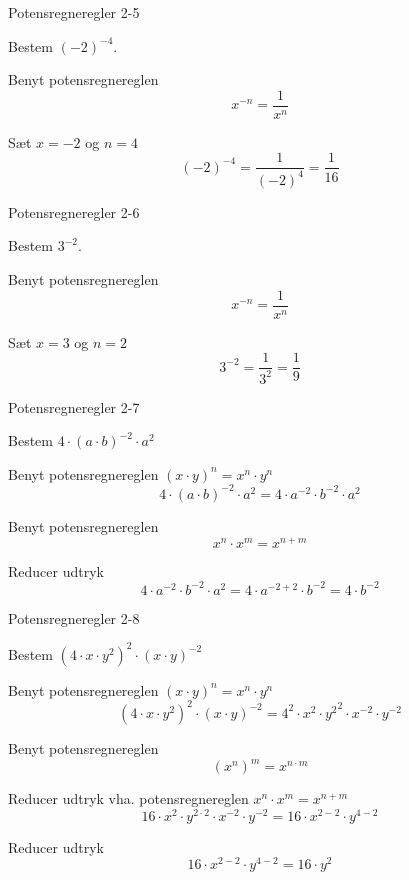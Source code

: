 \documentclass{article}
\begin{document}
\newpage

\begin{exercise}{Potensregneregler 2-5}

Bestem $(-2)^{-4}$.


\hint
Benyt potensregnereglen
\[
x^{-n} = \frac{1}{x^{n}}
\]

\hint

Sæt $x=-2$ og $n=4$
\[
(-2)^{-4} = \frac{1}{(-2)^4} = \frac{1}{16}
\]

\end{exercise}

\newpage

\begin{exercise}{Potensregneregler 2-6}

Bestem $3^{-2}$.


\hint
Benyt potensregnereglen
\[
x^{-n} = \frac{1}{x^{n}}
\]

\hint

Sæt $x=3$ og $n=2$
\[
3^{-2} = \frac{1}{3^2} = \frac{1}{9}
\]

\end{exercise}

\newpage

\begin{exercise}{Potensregneregler 2-7}

Bestem $4 \cdot (a \cdot b)^{-2} \cdot a^2$


\hint

Benyt potensregnereglen $(x \cdot y)^n = x^n \cdot y^n$
\[
4 \cdot (a \cdot b)^{-2} \cdot a^2 = 4 \cdot a^{-2} \cdot b^{-2} \cdot a^{2}
\]

\hint
Benyt potensregnereglen
\[
x^n \cdot x^m = x^{n + m}
\]

\hint

Reducer udtryk
\[
4 \cdot a^{-2} \cdot b^{-2} \cdot a^{2} = 4 \cdot a^{-2 + 2} \cdot b^{-2} = 4 \cdot b^{-2}
\]

\end{exercise}

\newpage

\begin{exercise}{Potensregneregler 2-8}

Bestem $(4 \cdot x \cdot y^2)^2 \cdot (x \cdot y)^{-2}$


\hint

Benyt potensregnereglen $(x \cdot y)^n = x^n \cdot y^n$
\[
(4 \cdot x \cdot y^2)^2 \cdot (x \cdot y)^{-2} = 4^2 \cdot x^2 \cdot {y^2}^2 \cdot x^{-2} \cdot y^{-2}
\]

\hint
Benyt potensregnereglen
\[
(x^n)^m = x^{n \cdot m}
\]

\hint
Reducer udtryk vha. potensregnereglen $x^n \cdot x^m = x^{n + m}$
\[
16 \cdot x^2 \cdot y^{2\cdot 2} \cdot x^{-2} \cdot y^{-2} = 16 \cdot x^{2 - 2} \cdot y^{4 - 2}
\]

\hint

Reducer udtryk
\[
16 \cdot x^{2 - 2} \cdot y^{4 - 2} = 16 \cdot y^2
\]

\end{exercise}
\end{document}
